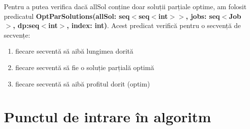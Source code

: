 Pentru a putea verifica dacă allSol conține doar soluții parțiale optime, am folosit predicatul \textbf{OptParSolutions(allSol: seq$<$seq$<$int$>$$>$, jobs: seq$<$Job$>$, dp:seq$<$int$>$, index: int)}. Acest predicat verifică pentru o secvență de secvențe:
\begin{enumerate}
    \item fiecare secventă să aibă lungimea dorită
    \item fiecare secventă să fie o soluție parțială optimă
    \item fiecare secventă să aibă profitul dorit (optim)
\end{enumerate}

\section{Punctul de intrare în algoritm}
